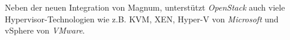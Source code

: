 \documentclass[../main.tex]{subfiles}
\begin{document}
      Neben der neuen Integration von Magnum, unterstützt \emph{OpenStack} auch viele Hypervisor-Technologien wie z.B. KVM, XEN, Hyper-V von \emph{Microsoft} und vSphere von \emph{VMware}.












\end{document}
